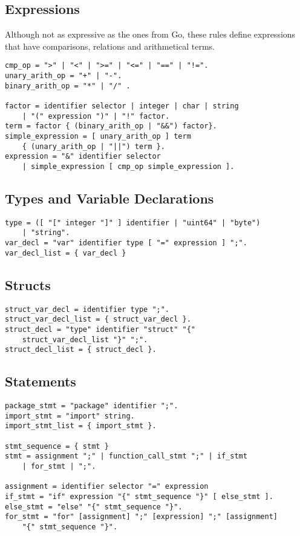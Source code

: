 \documentclass[a4paper]{report}
\begin{document}
      \subsection{Expressions}
        Although not as expressive as the ones from Go, these rules define expressions that have comparisons, relations and arithmetical terms. 

        \begin{lstlisting}[caption=Expressions]
cmp_op = ">" | "<" | ">=" | "<=" | "==" | "!=".
unary_arith_op = "+" | "-".
binary_arith_op = "*" | "/" .

factor = identifier selector | integer | char | string 
    | "(" expression ")" | "!" factor.	
term = factor { (binary_arith_op | "&&") factor}.
simple_expression = [ unary_arith_op ] term 
    { (unary_arith_op | "||") term }.
expression = "&" identifier selector 
    | simple_expression [ cmp_op simple_expression ].
        \end{lstlisting}

      \subsection{Types and Variable Declarations}

        \begin{lstlisting}[caption=Types]
type = ([ "[" integer "]" ] identifier | "uint64" | "byte") 
    | "string".
var_decl = "var" identifier type [ "=" expression ] ";".
var_decl_list = { var_decl }
        \end{lstlisting}

      \subsection{Structs}

        \begin{lstlisting}[caption=Structs]
struct_var_decl = identifier type ";".
struct_var_decl_list = { struct_var_decl }.
struct_decl = "type" identifier "struct" "{" 
    struct_var_decl_list "}" ";".
struct_decl_list = { struct_decl }. 
        \end{lstlisting}

      \subsection{Statements}

        \begin{lstlisting}[caption=Statements]
package_stmt = "package" identifier ";".
import_stmt = "import" string.
import_stmt_list = { import_stmt }.

stmt_sequence = { stmt }
stmt = assignment ";" | function_call_stmt ";" | if_stmt 
    | for_stmt | ";".

assignment = identifier selector "=" expression
if_stmt = "if" expression "{" stmt_sequence "}" [ else_stmt ].
else_stmt = "else" "{" stmt_sequence "}".
for_stmt = "for" [assignment] ";" [expression] ";" [assignment] 
    "{" stmt_sequence "}".
        \end{lstlisting}
\end{document}

